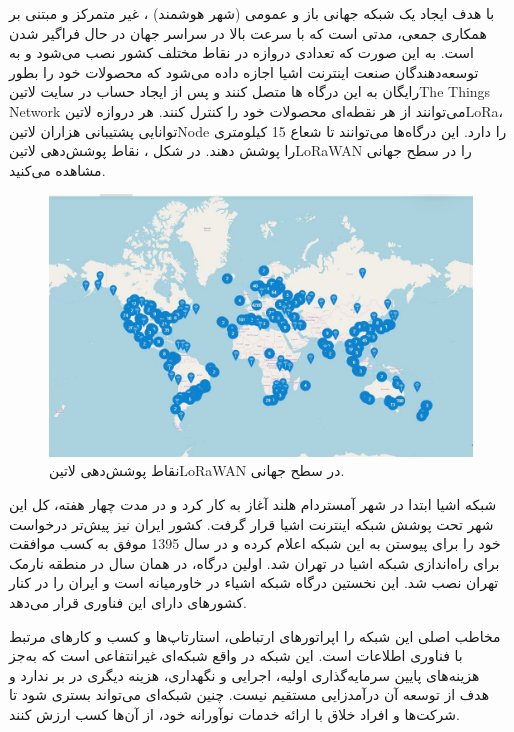  با هدف ایجاد یک شبکه جهانی باز و عمومی (شهر هوشمند) ، غیر متمرکز و مبتنی بر همکاری جمعی، مدتی است که با سرعت بالا در سراسر جهان در حال فراگیر شدن است. به این صورت که تعدادی دروازه در نقاط مختلف کشور نصب می‌شود و به توسعه‌دهندگان صنعت اینترنت اشیا اجازه داده می‌شود که محصولات خود را بطور رایگان به این درگاه ها متصل کنند و پس از ایجاد حساب در سایت ‌لاتین{The Things Network} می‌توانند از هر نقطه‌ای محصولات خود را کنترل کنند. هر دروازه ‌لاتین{LoRa}، توانایی پشتیبانی هزاران ‌لاتین{Node} را دارد. این درگاه‌ها می‌توانند تا شعاع 15 کیلومتری را پوشش دهند. در شکل ، نقاط پوشش‌دهی ‌لاتین{LoRaWAN} را در سطح جهانی مشاهده می‌کنید.
 
\begin{figure}[!h]
	\includegraphics[width=\linewidth]{Assets/loraGlobal.png}
	\caption{نقاط پوشش‌دهی ‌لاتین{LoRaWAN} در سطح جهانی.}
	\label{fig:loraGlobal}
\end{figure}

شبکه اشیا ابتدا در شهر آمستردام هلند آغاز به کار کرد و در مدت چهار هفته، کل این شهر تحت پوشش شبکه اینترنت اشیا قرار گرفت. کشور ایران نیز پیش‌تر درخواست خود را برای پیوستن به این شبکه اعلام کرده و در سال 1395 موفق به کسب موافقت برای راه‌اندازی شبکه اشیا در تهران شد. اولین درگاه، در همان سال در منطقه نارمک تهران نصب شد. این نخستین درگاه شبکه اشیاء در خاورمیانه است و ایران را در کنار کشورهای دارای این فناوری قرار می‌دهد.

مخاطب اصلی این شبکه را اپراتورهای ارتباطی، استارتاپ‌ها و کسب و کارهای مرتبط با فناوری اطلاعات است. این شبکه در واقع شبکه‌ای غیرانتفاعی است که به‌جز هزینه‌های پایین سرمایه‌گذاری اولیه، اجرایی و نگهداری، هزینه دیگری در بر ندارد و هدف از توسعه آن درآمدزایی مستقیم نیست. چنین شبکه‌ای می‌تواند بستری شود تا شرکت‌ها و افراد خلاق با ارائه خدمات نوآورانه خود، از آن‌ها کسب ارزش کنند. 

